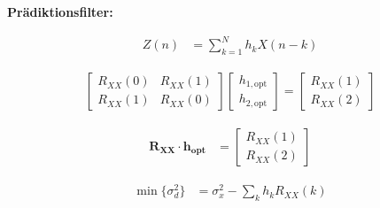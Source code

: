 \textbf{Prädiktionsfilter:}


\begin{align}
Z(n) &= \sum_{k=1}^{N} h_k X(n-k)
\end{align}

\begin{align}
\begin{bmatrix}
R_{XX}(0) & R_{XX}(1) \\
R_{XX}(1) & R_{XX}(0)
\end{bmatrix}
\begin{bmatrix}
h_{1,\text{opt}} \\
h_{2,\text{opt}}
\end{bmatrix}
=
\begin{bmatrix}
R_{XX}(1) \\
R_{XX}(2)
\end{bmatrix}
\end{align}

\begin{align}
\mathbf{R_{XX}} \cdot \mathbf{h_{\text{opt}}} &=
\begin{bmatrix}
R_{XX}(1) \\
R_{XX}(2)
\end{bmatrix}
\end{align}

\begin{align}
\min\{\sigma_d^2\} &= \sigma_x^2 - \sum_{k} h_k R_{XX}(k)
\end{align}
